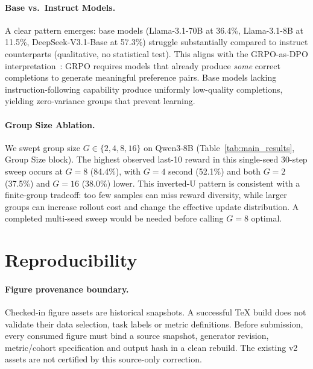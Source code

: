 \paragraph{Base vs.~Instruct Models.}
A clear pattern emerges: base models (Llama-3.1-70B at 36.4\%, Llama-3.1-8B at 11.5\%, DeepSeek-V3.1-Base at 57.3\%) struggle substantially compared to instruct counterparts (qualitative, no statistical test).
This aligns with the GRPO-as-DPO interpretation~\cite{wu2025grpodpo}: GRPO requires models that already produce \emph{some} correct completions to generate meaningful preference pairs.
Base models lacking instruction-following capability produce uniformly low-quality completions, yielding zero-variance groups that prevent learning.

\paragraph{Group Size Ablation.}
We swept group size $G \in \{2, 4, 8, 16\}$ on Qwen3-8B (Table~\ref{tab:main_results}, Group Size block).
The highest observed last-10 reward in this single-seed 30-step sweep occurs at
$G{=}8$ (84.4\%), with $G{=}4$ second (52.1\%) and both $G{=}2$ (37.5\%) and
$G{=}16$ (38.0\%) lower. This inverted-U pattern is consistent with a finite-group
tradeoff: too few samples can miss reward diversity, while larger groups can
increase rollout cost and change the effective update distribution. A completed
multi-seed sweep would be needed before calling $G{=}8$ optimal.

\section{Reproducibility}
\paragraph{Figure provenance boundary.}
Checked-in figure assets are historical snapshots. A successful TeX build does
not validate their data selection, task labels or metric definitions. Before
submission, every consumed figure must bind a source snapshot, generator
revision, metric/cohort specification and output hash in a clean rebuild.
The existing v2 assets are not certified by this source-only correction.

\label{sec:reproducibility}

